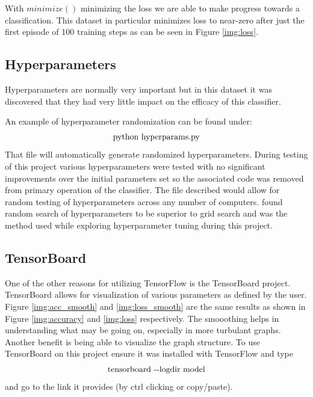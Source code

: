 \documentclass{article}
\begin{document}
  With $minimize()$ minimizing the loss we are able to make progress towards a 
  classification. This dataset in particular minimizes loss to near-zero after 
  just the first episode of 100 training steps as can be seen in Figure \ref{img:loss}.


\subsection{Hyperparameters}\label{sec:hyperparams}
  Hyperparameters are normally very important but in this dataset it was 
  discovered that they had very little impact on the efficacy of 
  this classifier.

  An example of hyperparameter randomization can be found under:
  \[\textnormal{python\ hyperparams.py}\]
  That file will automatically generate randomized hyperparameters. During 
  testing of this project various hyperparameters were tested with no 
  significant improvements over the initial parameters set so the associated 
  code was removed from primary operation of the classifier. The file described 
  would allow for random testing of hyperparameters across any number of 
  computers. \citet{hypparam} found random search of hyperparameters to be superior to grid search and was the method used while exploring 
  hyperparameter tuning during this project.

\subsection{TensorBoard}\label{sec:tensorboard}
  One of the other reasons for utilizing TensorFlow is the TensorBoard project. 
  TensorBoard allows for visualization of various parameters as defined by the 
  user. Figure \ref{img:acc_smooth} and \ref{img:loss_smooth} are the same results as shown in Figure \ref{img:accuracy} and \ref{img:loss} 
  respectively. The smooothing helps in understanding what may be going on, 
  especially in more turbulant graphs. Another benefit is being able to 
  visualize the graph structure. To use TensorBoard on this project ensure it 
  was installed with TensorFlow and type 
  \[\textnormal{tensorboard\ -\--logdir\ model}\]
  and go to the link it provides (by ctrl clicking or copy/paste). 
\end{document}
